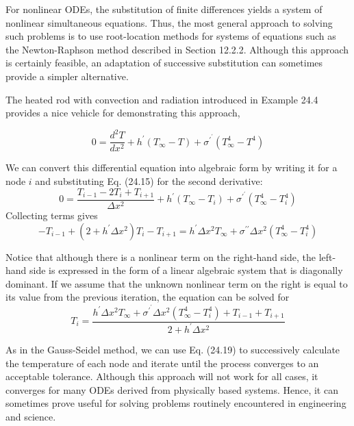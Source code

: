 \documentclass[../main.tex]{subfiles}
\begin{document}
\noindent For nonlinear ODEs, the substitution of finite differences yields a system of nonlinear simultaneous equations. Thus, the most general approach to solving such problems is to use
root-location methods for systems of equations such as the Newton-Raphson method described in Section 12.2.2. Although this approach is certainly feasible, an adaptation of
successive substitution can sometimes provide a simpler alternative.

The heated rod with convection and radiation introduced in Example 24.4 provides a
nice vehicle for demonstrating this approach,

\begin{equation} \nonumber
    0=\frac{d^{2} T}{d x^{2}}+h^{\prime}\left(T_{\infty}-T\right)+\sigma^{\prime^{\prime}}\left(T_{\infty}^{4}-T^{4}\right)
\end{equation}

\noindent We can convert this differential equation into algebraic form by writing it for a node $i$ and substituting Eq. (24.15) for the second derivative:
$$
0=\frac{T_{i-1}-2 T_{i}+T_{i+1}}{\Delta x^{2}}+h^{\prime}\left(T_{\infty}-T_{i}\right)+\sigma^{\prime^{\prime}}\left(T_{\infty}^{4}-T_{i}^{4}\right)
$$
Collecting terms gives
$$
-T_{i-1}+\left(2+h^{\prime} \Delta x^{2}\right) T_{i}-T_{i+1}=h^{\prime} \Delta x^{2} T_{\infty}+\sigma^{\prime \prime} \Delta x^{2}\left(T_{\infty}^{4}-T_{i}^{4}\right)
$$

Notice that although there is a nonlinear term on the right-hand side, the left-hand side is expressed in the form of a linear algebraic system that is diagonally dominant. If we assume that the unknown nonlinear term on the right is equal to its value from the previous iteration, the equation can be solved for
\begin{equation}
    \tag{24.19}
    T_{i}=\frac{h^{\prime} \Delta x^{2} T_{\infty}+\sigma^{\prime^{\prime}} \Delta x^{2}\left(T_{\infty}^{4}-T_{i}^{4}\right)+T_{i-1}+T_{i+1}}{2+h^{\prime} \Delta x^{2}}
\end{equation}

\noindent As in the Gauss-Seidel method, we can use Eq. (24.19) to successively calculate the temperature of each node and iterate until the process converges to an acceptable tolerance. Although this approach will not work for all cases, it converges for many ODEs derived from physically based systems. Hence, it can sometimes prove useful for solving problems routinely encountered in engineering and science.\vspace*{\smallskipamount}
\end{document}
